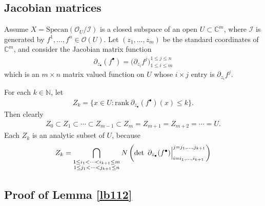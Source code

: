 \documentclass[12pt,b5paper,notitlepage]{report}
\theoremstyle{definition}
\theoremstyle{plain}
\newcommand{\mc}{\mathcal}
\newcommand{\scr}{\mathscr}
\newcommand{\blt}{\bullet}
\newcommand{\Cbb}{\mathbb C}
\newcommand{\Nbb}{\mathbb N}
\newcommand{\Specan}{\mathrm{Specan}}
\newcommand{\rank}{\mathrm{rank}}
\numberwithin{equation}{section}
\begin{document}
\subsection{Jacobian matrices}\label{lb116}




Assume $X=\Specan(\scr O_U/\mc I)$ is a closed subspace of an open $U\subset\Cbb^m$, where $\mc I$ is generated by $f^1,\dots,f^n\in\scr O(U)$. Let $(z_1,\dots,z_m)$ be the standard coordinates of $\Cbb^m$, and consider the Jacobian matrix function
\begin{align*}
\partial_{z_\blt}(f^\blt)=\Big(\partial_{z_i}f^j\Big)_{1\leq i\leq m}^{1\leq j\leq n}
\end{align*}
which is an $m\times n$ matrix valued function on $U$ whose $i\times j$ entry is $\partial_{z_i}f^j$. 


For each $k\in\Nbb$, let
\begin{align}
Z_k=\{x\in U:\rank~ \partial_{z_\blt}(f^\blt)(x)\leq k\}.
\end{align}
Then clearly
\begin{align}
Z_0\subset Z_1\subset\cdots\subset Z_{m-1}\subset Z_m= Z_{m+1}=Z_{m+2}=\cdots=U.
\end{align}
Each $Z_k$ is an analytic subset of $U$, because
\begin{align}\label{eq59}
Z_k=\bigcap_{
\begin{subarray}{c}
1\leq i_1<\cdots <i_{k+1}\leq m\\
1\leq j_1<\cdots<j_{k+1}\leq n
\end{subarray}}
N\left(\det~\partial_{z_\blt}(f^\blt)\Big|_{i=i_1,\dots,i_{k+1}}^{j=j_1,\dots,j_{k+1}}\right)
\end{align}




\subsection{Proof of Lemma \ref{lb112}}\label{lb386}
\end{document}
